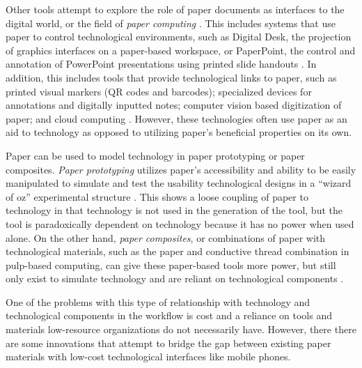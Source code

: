 \documentclass{sig-alternate}
\begin{document}
Other tools attempt to explore the role of paper documents as interfaces to the digital world, or the field of \emph{paper computing} \cite{kaplan2010}. This includes systems that use paper to control technological environments, such as Digital Desk, the projection of graphics interfaces on a paper-based workspace, or PaperPoint, the control and annotation of PowerPoint presentations using printed slide handouts \cite{newman1992,wellner1993,signer2007}. In addition, this includes tools that provide technological links to paper, such as printed visual markers (QR codes and barcodes); specialized devices for annotations and digitally inputted notes; computer vision based digitization of paper; and cloud computing \cite{kaplan2010,anoto,pietrzak2010}. However, these technologies often use paper as an aid to technology as opposed to utilizing paper's beneficial properties on its own. 

Paper can be used to model technology in paper prototyping or paper composites. \emph{Paper prototyping} utilizes paper's accessibility and ability to be easily manipulated to simulate and test the usability technological designs in a ``wizard of oz'' experimental structure \cite{synder2001,chandler2002}. This shows a loose coupling of paper to technology in that technology is not used in the generation of the tool, but the tool is paradoxically dependent on technology because it has no power when used alone. On the other hand, \emph{paper composites}, or combinations of paper with technological materials, such as the paper and conductive thread combination in pulp-based computing, can give these paper-based tools more power, but still only exist to simulate technology and are reliant on technological components \cite{coelho2009}.

One of the problems with this type of relationship with technology and technological components in the workflow is cost and a reliance on tools and materials low-resource organizations do not necessarily have. However, there there are some innovations that attempt to bridge the gap between existing paper materials with low-cost technological interfaces like mobile phones.
\end{document}
